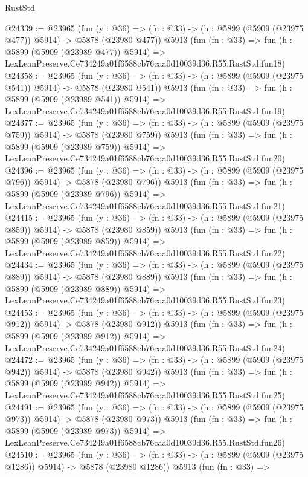 \begin{lexlean}{RustStd}
\begin{coremodule}
{{@24339 := @23965
    (fun (y : @36) => (fn : @33) -> (h : @5899 (@5909 (@23975 @477)) @5914) -> @5878 (@23980 @477))
    @5913
    (fun (fn : @33) =>
    fun (h : @5899 (@5909 (@23989 @477)) @5914) =>
    LexLeanPreserve.Ce734249a01f6588cb76caa0d10039d36.R55.RustStd.fun18)
@24358 := @23965
    (fun (y : @36) => (fn : @33) -> (h : @5899 (@5909 (@23975 @541)) @5914) -> @5878 (@23980 @541))
    @5913
    (fun (fn : @33) =>
    fun (h : @5899 (@5909 (@23989 @541)) @5914) =>
    LexLeanPreserve.Ce734249a01f6588cb76caa0d10039d36.R55.RustStd.fun19)
@24377 := @23965
    (fun (y : @36) => (fn : @33) -> (h : @5899 (@5909 (@23975 @759)) @5914) -> @5878 (@23980 @759))
    @5913
    (fun (fn : @33) =>
    fun (h : @5899 (@5909 (@23989 @759)) @5914) =>
    LexLeanPreserve.Ce734249a01f6588cb76caa0d10039d36.R55.RustStd.fun20)
@24396 := @23965
    (fun (y : @36) => (fn : @33) -> (h : @5899 (@5909 (@23975 @796)) @5914) -> @5878 (@23980 @796))
    @5913
    (fun (fn : @33) =>
    fun (h : @5899 (@5909 (@23989 @796)) @5914) =>
    LexLeanPreserve.Ce734249a01f6588cb76caa0d10039d36.R55.RustStd.fun21)
@24415 := @23965
    (fun (y : @36) => (fn : @33) -> (h : @5899 (@5909 (@23975 @859)) @5914) -> @5878 (@23980 @859))
    @5913
    (fun (fn : @33) =>
    fun (h : @5899 (@5909 (@23989 @859)) @5914) =>
    LexLeanPreserve.Ce734249a01f6588cb76caa0d10039d36.R55.RustStd.fun22)
@24434 := @23965
    (fun (y : @36) => (fn : @33) -> (h : @5899 (@5909 (@23975 @889)) @5914) -> @5878 (@23980 @889))
    @5913
    (fun (fn : @33) =>
    fun (h : @5899 (@5909 (@23989 @889)) @5914) =>
    LexLeanPreserve.Ce734249a01f6588cb76caa0d10039d36.R55.RustStd.fun23)
@24453 := @23965
    (fun (y : @36) => (fn : @33) -> (h : @5899 (@5909 (@23975 @912)) @5914) -> @5878 (@23980 @912))
    @5913
    (fun (fn : @33) =>
    fun (h : @5899 (@5909 (@23989 @912)) @5914) =>
    LexLeanPreserve.Ce734249a01f6588cb76caa0d10039d36.R55.RustStd.fun24)
@24472 := @23965
    (fun (y : @36) => (fn : @33) -> (h : @5899 (@5909 (@23975 @942)) @5914) -> @5878 (@23980 @942))
    @5913
    (fun (fn : @33) =>
    fun (h : @5899 (@5909 (@23989 @942)) @5914) =>
    LexLeanPreserve.Ce734249a01f6588cb76caa0d10039d36.R55.RustStd.fun25)
@24491 := @23965
    (fun (y : @36) => (fn : @33) -> (h : @5899 (@5909 (@23975 @973)) @5914) -> @5878 (@23980 @973))
    @5913
    (fun (fn : @33) =>
    fun (h : @5899 (@5909 (@23989 @973)) @5914) =>
    LexLeanPreserve.Ce734249a01f6588cb76caa0d10039d36.R55.RustStd.fun26)
@24510 := @23965
    (fun (y : @36) =>
    (fn : @33) -> (h : @5899 (@5909 (@23975 @1286)) @5914) -> @5878 (@23980 @1286))
    @5913
    (fun (fn : @33) =>
}}
\end{coremodule}
\end{lexlean}
